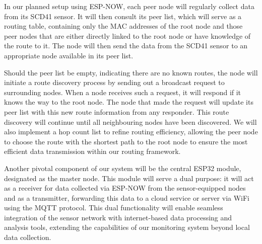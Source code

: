 In our planned setup using ESP-NOW, each peer node will regularly collect data from its SCD41 sensor. It will then consult its peer list, which will serve as a routing table, containing only the MAC addresses of the root node and those peer nodes that are either directly linked to the root node or have knowledge of the route to it. The node will then send the data from the SCD41 sensor to an appropriate node available in its peer list.

Should the peer list be empty, indicating there are no known routes, the node will initiate a route discovery process by sending out a broadcast request to surrounding nodes. When a node receives such a request, it will respond if it knows the way to the root node. The node that made the request will update its peer list with this new route information from any responder. This route discovery will continue until all neighbouring nodes have been discovered. We will also implement a hop count list to refine routing efficiency, allowing the peer node to choose the route with the shortest path to the root node to ensure the most efficient data transmission within our routing framework.

Another pivotal component of our system will be the central ESP32 module, designated as the master node. This module will serve a dual purpose: it will act as a receiver for data collected via ESP-NOW from the sensor-equipped nodes and as a transmitter, forwarding this data to a cloud service or server via WiFi using the MQTT protocol. This dual functionality will enable seamless integration of the sensor network with internet-based data processing and analysis tools, extending the capabilities of our monitoring system beyond local data collection.



